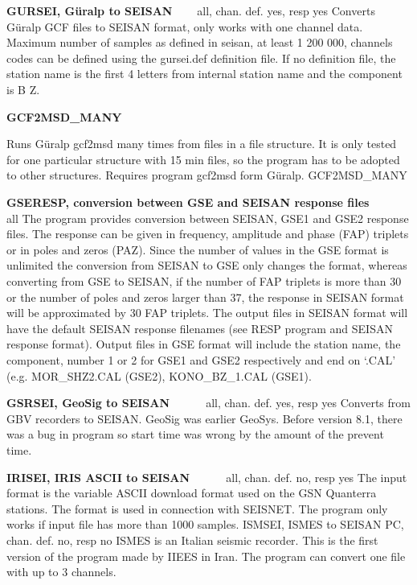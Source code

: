 \textbf{GURSEI, G\"uralp to SEISAN} \verb|   | all, chan. def. yes, resp yes\newline
Converts G\"uralp GCF files to SEISAN format, only works with one channel data. Maximum number of samples as defined in seisan, at least 1 200 000, channels codes can be defined using the gursei.def 
definition file. If no definition file, the station name is the first 4 letters from internal station name and the component is B Z. 

\textbf{GCF2MSD\_MANY}

Runs G\"uralp gcf2msd many times from files in a file structure. It is only tested for one particular structure with 15 min files, so the program has to be adopted to other structures. Requires program gcf2msd form G\"uralp. \index GCF2MSD\_MANY

 
\textbf{GSERESP, conversion between GSE and SEISAN response files} \verb|     | all \newline
The program provides conversion between SEISAN, GSE1 and GSE2 response files. The response can be given in frequency, amplitude and phase (FAP) triplets or in poles and zeros (PAZ). Since the number of values in the GSE format is unlimited the conversion from SEISAN to GSE only changes the format, whereas converting from GSE to SEISAN, if the number of FAP triplets is more than 30 or the number of poles and zeros larger than 37, the response in SEISAN format will be approximated by 30 FAP triplets. The output files in SEISAN format will have the default SEISAN response filenames (see RESP program and SEISAN response format). Output files in GSE format will include the station name, the component, number 1 or 2 for GSE1 and GSE2 respectively and end on `.CAL' (e.g. MOR\_SHZ2.CAL (GSE2), KONO\_BZ\_1.CAL (GSE1). 

\textbf{GSRSEI, GeoSig to SEISAN} \verb|     | all, chan. def. yes, resp yes\newline
{}
Converts from GBV recorders to SEISAN. GeoSig was earlier GeoSys. Before version 8.1, there was a bug in program so start time was wrong by the amount of the prevent time. 

\textbf{IRISEI, IRIS ASCII to SEISAN} \verb|     | all, chan. def. no, resp yes \newline
{}
The input format is the variable ASCII download format used on the GSN Quanterra stations. The format is used in connection with SEISNET. The program only works if input file has more than 1000 samples. ISMSEI, ISMES to SEISAN PC, chan. def. no, resp no ISMES is an Italian seismic recorder. This is the first version of the program made by IIEES in Iran. The program can convert one file with up to 3 channels. 

